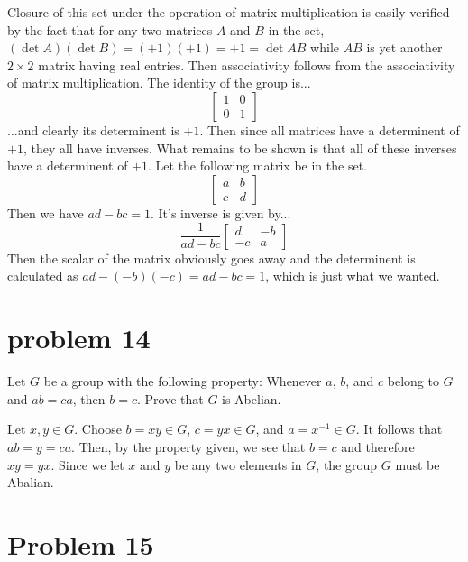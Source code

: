 \documentclass{article}
\begin{document}
Closure of this set under the operation of matrix multiplication is easily
verified by the fact that for any two matrices $A$ and $B$ in the set, $(\det{A})(\det{B})=(+1)(+1)=+1=\det{AB}$
while $AB$ is yet another $2\times 2$ matrix having real entries.  Then associativity follows
from the associativity of matrix multiplication.  The identity of the group is...
\begin{equation*}
\left[\begin{array}{cc}1&0\\0&1\end{array}\right]
\end{equation*}
...and clearly its determinent is $+1$.  Then since all matrices have a determinent of $+1$,
they all have inverses.  What remains to be shown is that all of these inverses have a determinent
of $+1$.  Let the following matrix be in the set.
\begin{equation*}
\left[\begin{array}{cc}a&b\\c&d\end{array}\right]
\end{equation*}
Then we have $ad-bc=1$.  It's inverse is given by...
\begin{equation*}
\frac{1}{ad-bc}\left[\begin{array}{cc}d&-b\\-c&a\end{array}\right]
\end{equation*}
Then the scalar of the matrix obviously goes away and the determinent is calculated
as $ad-(-b)(-c)=ad-bc=1$, which is just what we wanted.

\section*{problem 14}

Let $G$ be a group with the following property: Whenever $a$, $b$, and $c$
belong to $G$ and $ab=ca$, then $b=c$.  Prove that $G$ is Abelian.

Let $x,y\in G$.  Choose $b=xy\in G$, $c=yx\in G$, and $a=x^{-1}\in G$.  It follows
that $ab=y=ca$.  Then, by the property given, we see that $b=c$ and
therefore $xy=yx$.  Since we let $x$ and $y$ be any two elements in
$G$, the group $G$ must be Abalian.

\section*{Problem 15}
\end{document}
